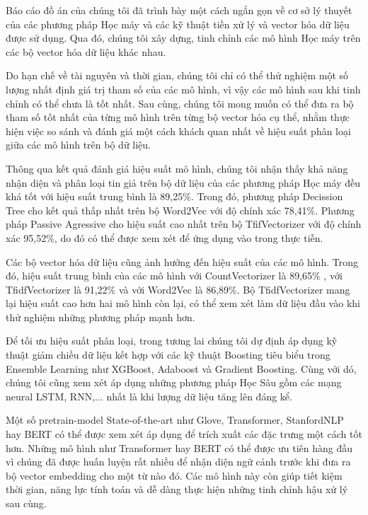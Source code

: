 \documentclass[12pt,a4paper,oneside]{book}
\begin{document}
Báo cáo đồ án của chúng tôi đã trình bày một cách ngắn gọn về cơ sở lý thuyết của các phương pháp Học máy và các kỹ thuật tiền xử lý và vector hóa dữ liệu được sử dụng. Qua đó, chúng tôi xây dựng, tinh chỉnh các mô hình Học máy trên các bộ vector hóa dữ liệu khác nhau.

Do hạn chế về tài nguyên và thời gian, chúng tôi chỉ có thể thử nghiệm một số lượng nhất định giá trị tham số của các mô hình, vì vậy các mô hình sau khi tinh chỉnh có thể chưa là tốt nhất. Sau cùng, chúng tôi mong muốn có thể đưa ra bộ tham số tốt nhất của từng mô hình trên từng bộ vector hóa cụ thể, nhằm thực hiện việc so sánh và đánh giá một cách khách quan nhất về hiệu suất phân loại giữa các mô hình trên bộ dữ liệu.

Thông qua kết quả đánh giá hiệu suất mô hình, chúng tôi nhận thấy khả năng nhận diện và phân loại tin giả trên bộ dữ liệu của các phương pháp Học máy đều khá tốt với hiệu suất trung bình là 89,25\%. Trong đó, phương pháp Decission Tree cho kết quả thấp nhất trên bộ Word2Vec với độ chính xác 78,41\%. Phương pháp Passive Agressive cho hiệu suất cao nhất trên bộ TfifVectorizer với độ chính xác 95,52\%, do đó có thể được xem xét để ứng dụng vào trong thực tiễn.

Các bộ vector hóa dữ liệu cũng ảnh hưởng đến hiệu suất của các mô hình. Trong đó, hiệu suất trung bình của các mô hình với CountVectorizer là 89,65\% , với TfidfVectorizer là 91,22\% và với Word2Vec là 86,89\%. Bộ TfidfVectorizer mang lại hiệu suất cao hơn hai mô hình còn lại, có thể xem xét làm dữ liệu đầu vào khi thử nghiệm những phương pháp mạnh hơn.

Để tối ưu hiệu suất phân loại, trong tương lai chúng tôi dự định áp dụng kỹ thuật giảm chiều dữ liệu kết hợp với các kỹ thuật Boosting tiêu biểu trong Ensemble Learning như XGBoost, Adaboost và Gradient Boosting. Cùng với dó, chúng tôi cũng xem xét áp dụng những phương pháp Học Sâu gồm các mạng neural LSTM, RNN,... nhất là khi lượng dữ liệu tăng lên đáng kể.

Một số pretrain-model State-of-the-art như Glove, Transformer, StanfordNLP hay BERT có thể được xem xét áp dụng để trích xuất các đặc trưng một cách tốt hơn. Những mô hình như Transformer hay BERT có thể được ưu tiên hàng đầu vì chúng đã được huấn luyện rất nhiều để nhận diện ngữ cảnh trước khi đưa ra bộ vector embedding cho một từ nào đó. Các mô hình này còn giúp tiết kiệm thời gian, năng lực tính toán và dễ dàng thực hiện những tinh chỉnh hậu xử lý sau cùng.
\end{document}
